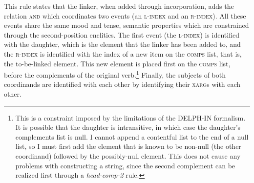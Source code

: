 This rule states that the linker, when added through incorporation, adds the relation \textsc{and} which coordinates two events (an \textsc{l-index} and an \textsc{r-index}). All these events share the same mood and tense, semantic properties which are constrained through the second-position enclitics. The first event (the \textsc{l-index}) is identified with the daughter, which is the element that the linker has been added to, and the \textsc{r-index} is identified with the index of a new item on the \textsc{comps} list, that is, the to-be-linked element. This new element is placed first on the \textsc{comps} list, before the complements of the original verb.\footnote{This is a constraint imposed by the limitations of the DELPH-IN formalism. It is possible that the daughter is intransitive, in which case the daughter's complements list is null. I cannot append a contentful list to the end of a null list, so I must first add the element that is known to be non-null (the other coordinand) followed by the possibly-null element. This does not cause any problems with constructing a string, since the second complement can be realized first through a {\textit{head-comp-2}} rule.} Finally, the subjects of both coordinands are identified with each other by identifying their \textsc{xarg}s with each other.

